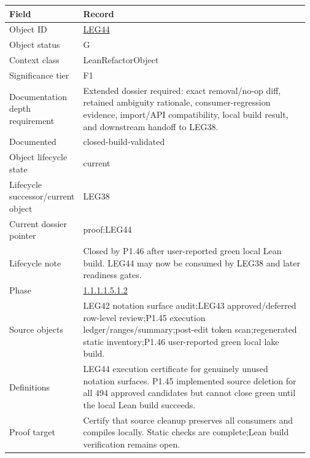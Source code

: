 \begin{longtable}{L{0.16\linewidth} L{0.81\linewidth}}
\hline
\textbf{Field} & \textbf{Record}\\
\hline
Object ID & \hyperlink{object-row-LEG44}{LEG44}\\
\hline\addlinespace[0.20em]
Object status & G\\
\hline\addlinespace[0.20em]
Context class & LeanRefactorObject\\
\hline\addlinespace[0.20em]
Significance tier & F1\\
\hline\addlinespace[0.20em]
Documentation depth requirement & Extended dossier required: exact removal/\allowbreak{}no-op diff, retained ambiguity rationale, consumer-regression evidence, import/\allowbreak{}API compatibility, local build result, and downstream handoff to LEG38.\\
\hline\addlinespace[0.20em]
Documented & closed-build-validated\\
\hline\addlinespace[0.20em]
Object lifecycle state & current\\
\hline\addlinespace[0.20em]
Lifecycle successor/\allowbreak{}current object & LEG38\\
\hline\addlinespace[0.20em]
Current dossier pointer & proof:LEG44\\
\hline\addlinespace[0.20em]
Lifecycle note & Closed by P1.46 after user-reported green local Lean build. LEG44 may now be consumed by LEG38 and later readiness gates.\\
\hline\addlinespace[0.20em]
Phase & \hyperlink{phase-row-1-1-1-1-5-1-2}{1.1.1.1.5.1.2}\\
\hline\addlinespace[0.20em]
Source objects & LEG42 notation surface audit;\newline LEG43 approved/\allowbreak{}deferred row-level review;\newline P1.45 execution ledger/\allowbreak{}ranges/\allowbreak{}summary;\newline post-edit token scan;\newline regenerated static inventory;\newline P1.46 user-reported green local lake build.\\
\hline\addlinespace[0.20em]
Definitions & LEG44 execution certificate for genuinely unused notation surfaces. P1.45 implemented source deletion for all 494 approved candidates but cannot close green until the local Lean build succeeds.\\
\hline\addlinespace[0.20em]
Proof target & Certify that source cleanup preserves all consumers and compiles locally. Static checks are complete;\newline Lean build verification remains open.\\

\end{longtable}
